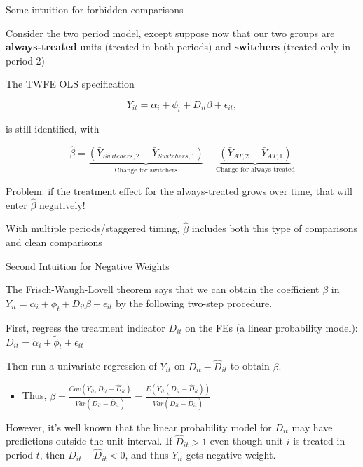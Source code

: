 \documentclass[aspectratio = 169, 13pt]{beamer}
\begin{document}
\begin{frame}{Some intuition for forbidden comparisons}
  \begin{wideitemize}
    \item
    Consider the two period model, except suppose now that our two groups are \textbf{always-treated} units (treated in both periods) and \textbf{switchers} (treated only in period 2)

    \item
    The TWFE OLS specification

    $$ Y_{it} = \alpha_i + \phi_t + D_{it} \beta  + \epsilon_{it},$$

    is still identified, with

    $$\hat\beta =  \underbrace{ \left(\bar{Y}_{Switchers, 2} - \bar{Y}_{Switchers, 1} \right) }_{\text{Change for switchers}} - \underbrace{ \left(\bar{Y}_{AT, 2} - \bar{Y}_{AT, 1} \right) }_{\text{Change for always treated}}  $$

    \item
    Problem: if the treatment effect for the always-treated grows over time, that will enter $\hat\beta$ negatively!

    \item
    With multiple periods/staggered timing, $\hat\beta$ includes both this type of comparisons and clean comparisons
  \end{wideitemize}
\end{frame}

\begin{frame}{Second Intuition for Negative Weights}
	\begin{wideitemize}
		\item
		The Frisch-Waugh-Lovell theorem says that we can obtain the coefficient $\beta$ in 	
		$Y_{it} = \alpha_i + \phi_t + D_{it} \beta  + \epsilon_{it}$ by the following two-step procedure. 
		
		\item
		First, regress the treatment indicator $D_{it}$ on the FEs (a linear probability model): $D_{it} = \tilde{\alpha}_i + \tilde{\phi}_t + \tilde{\epsilon_{it}} $
		
		\item
		
		\noindent Then run a univariate regression of $Y_{it}$ on $D_{it}-\hat{D}_{it}$ to obtain $\beta$.
		
		\begin{itemize}
			\item 
			Thus, $\beta = \frac{Cov( Y_{it}, D_{it} - \hat{D}_{it} )}{ Var(D_{it} - \hat{D}_{it})  } =  \frac{E( Y_{it} (D_{it} - \hat{D}_{it})) }{ Var(D_{it} - \hat{D}_{it})  }$
		\end{itemize}
		
		\item
		However, it's well known that the linear probability model for $D_{it}$ may have predictions outside the unit interval. If $\hat{D}_{it}>1$ even though unit $i$ is treated in period $t$, then $D_{it}- \hat{D}_{it} <0$, and thus $Y_{it}$ gets negative weight. 
	\end{wideitemize}
\end{frame}
\end{document}
